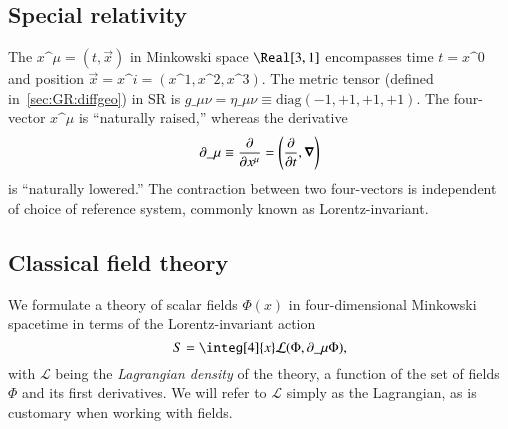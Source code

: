 



\subsection{Special relativity}
    The  $x\^\mu=(t, \vec{x})$ in Minkowski space $\Real[3,1]$ encompasses time $t=x\^0$ and position $\vec{x}=x\^i= (x\^1, x\^2, x\^3)$. The {metric tensor} (defined in~\cref{sec:GR:diffgeo}) in SR is $g\_{\mu\nu}= \eta\_{\mu\nu} \equiv \text{diag} (-1,+1,+1,+1)$. The four-vector $x\^\mu$ is ``naturally raised,'' whereas the derivative
    \begin{equation}
        \partial\_\mu \equiv \pdv{}{x\^\mu} =\pclosed{ \pdv{}{t}, \vec{\nabla} }
    \end{equation}
    is ``naturally lowered.'' The contraction between two four-vectors is independent of choice of reference system, commonly known as Lorentz-invariant.





\subsection{Classical field theory}
    We formulate a theory of scalar fields $\Phi(x)$ in four-dimensional Minkowski spacetime in terms of the Lorentz-invariant action
    \begin{equation}
        S = \integ[4]{x} \mathcal{L}(\Phi, \partial\_\mu \Phi),
    \end{equation}
    with $\mathcal{L}$ being the \emph{Lagrangian density} of the theory, a function of the set of fields $\Phi$ and its first derivatives. We will refer to $\mathcal{L}$ simply as the Lagrangian, as is customary when working with fields. 

